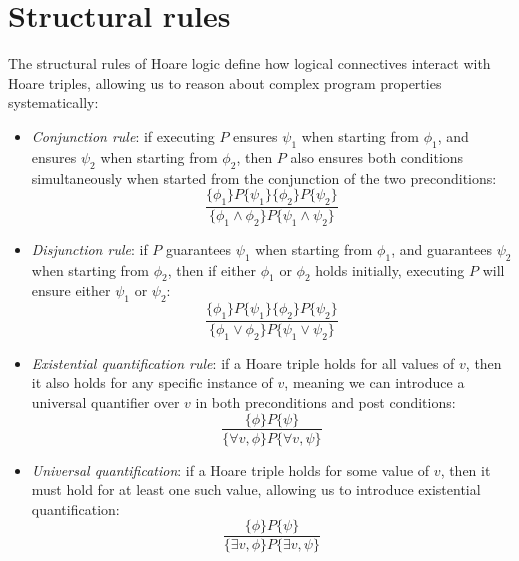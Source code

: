 \section{Structural rules}

The structural rules of Hoare logic define how logical connectives interact with Hoare triples, allowing us to reason about complex program properties systematically:
\begin{itemize}
    \item \textit{Conjunction rule}: if executing $P$ ensures $\psi_1$ when starting from $\phi_1$, and ensures $\psi_2$ when starting from $\phi_2$, then $P$ also ensures both conditions simultaneously when started from the conjunction of the two preconditions:
        \[\dfrac{\{\phi_1\}P\{\psi_1\}\{\phi_2\}P\{\psi_2\}}{\{\phi_1\land\phi_2\}P\{\psi_1\land\psi_2\}}\]
    \item \textit{Disjunction rule}: if $P$ guarantees $\psi_1$ when starting from $\phi_1$, and guarantees $\psi_2$ when starting from $\phi_2$, then if either $\phi_1$ or $\phi_2$ holds initially, executing $P$ will ensure either $\psi_1$ or $\psi_2$: 
        \[\dfrac{\{\phi_1\}P\{\psi_1\}\{\phi_2\}P\{\psi_2\}}{\{\phi_1\lor\phi_2\}P\{\psi_1\lor\psi_2\}}\]
    \item \textit{Existential quantification rule}: if a Hoare triple holds for all values of $v$, then it also holds for any specific instance of $v$, meaning we can introduce a universal quantifier over $v$ in both preconditions and post conditions: 
        \[\dfrac{\{\phi\}P\{\psi\}}{\{\forall v,\phi\}P\{\forall v,\psi\}}\]
    \item \textit{Universal quantification}: if a Hoare triple holds for some value of $v$, then it must hold for at least one such value, allowing us to introduce existential quantification:
        \[\dfrac{\{\phi\}P\{\psi\}}{\{\exists v,\phi\}P\{\exists v,\psi\}}\]
\end{itemize}